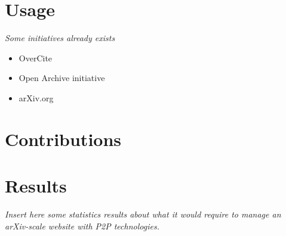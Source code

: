 \section{Usage}

\textit{Some initiatives already exists}

\begin{itemize}
\item OverCite
\item Open Archive initiative
\item arXiv.org
\end{itemize}

\section{Contributions}


\section{Results}

\textit{Insert here some statistics results about what
it would require to manage an arXiv-scale website with P2P technologies.}

